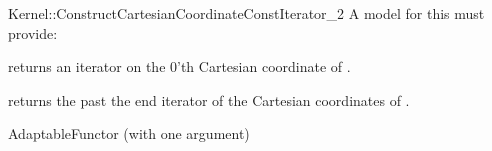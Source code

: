 \begin{ccRefFunctionObjectConcept}{Kernel::ConstructCartesianCoordinateConstIterator_2}
A model for this must provide:



 {returns an iterator on the 0'th Cartesian coordinate of .}

 {returns the past the end iterator of the Cartesian coordinates of .}




\ccRefines
AdaptableFunctor (with one argument)

\ccSeeAlso
{} \\

\end{ccRefFunctionObjectConcept}
